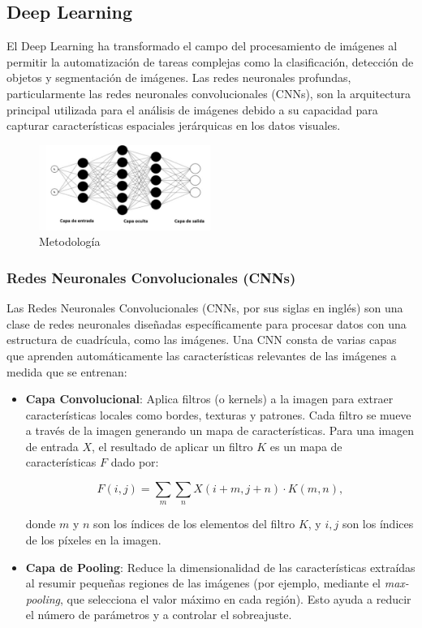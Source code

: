 \subsection{Deep Learning}
El Deep Learning ha transformado el campo del procesamiento de imágenes al permitir la automatización de tareas complejas como la clasificación, detección de objetos y segmentación de imágenes. Las redes neuronales profundas, particularmente las redes neuronales convolucionales (CNNs), son la arquitectura principal utilizada para el análisis de imágenes debido a su capacidad para capturar características espaciales jerárquicas en los datos visuales.


\begin{figure}[h]
    \centering
    \includegraphics[width=0.5\textwidth]{2/figures/Redes neuronales.png}
    \caption{Metodología}
    \label{fig:etiqueta_de_la_figura}
\end{figure}

\subsubsection{Redes Neuronales Convolucionales (CNNs)}
Las Redes Neuronales Convolucionales (CNNs, por sus siglas en inglés) son una clase de redes neuronales diseñadas específicamente para procesar datos con una estructura de cuadrícula, como las imágenes. Una CNN consta de varias capas que aprenden automáticamente las características relevantes de las imágenes a medida que se entrenan:

\begin{itemize}
    \item \textbf{Capa Convolucional}: Aplica filtros (o kernels) a la imagen para extraer características locales como bordes, texturas y patrones. Cada filtro se mueve a través de la imagen generando un mapa de características. Para una imagen de entrada \(X\), el resultado de aplicar un filtro \(K\) es un mapa de características \(F\) dado por:

    \[
    F(i,j) = \sum_m \sum_n X(i+m,j+n) \cdot K(m,n),
    \]

    donde \(m\) y \(n\) son los índices de los elementos del filtro \(K\), y \(i, j\) son los índices de los píxeles en la imagen.

    \item \textbf{Capa de Pooling}: Reduce la dimensionalidad de las características extraídas al resumir pequeñas regiones de las imágenes (por ejemplo, mediante el \textit{max-pooling}, que selecciona el valor máximo en cada región). Esto ayuda a reducir el número de parámetros y a controlar el sobreajuste.
\end{itemize}



